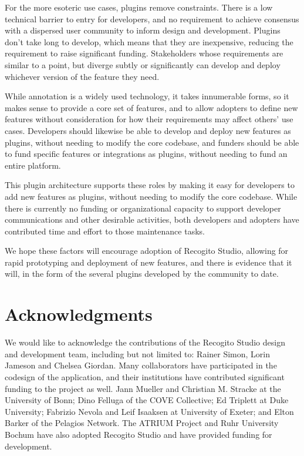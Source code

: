 \documentclass[final]{anthology-ch}         %
\begin{document}
  For the more esoteric use cases, plugins remove constraints. There is a low technical barrier to entry for developers, and no requirement to achieve consensus with a dispersed user community to inform design and development. Plugins don't take long to develop, which means that they are inexpensive, reducing the requirement to raise significant funding. Stakeholders whose requirements are similar to a point, but diverge subtly or significantly can develop and deploy whichever version of the feature they need.
  
  While annotation is a widely used technology, it takes innumerable forms, so it makes sense to provide a core set of features, and to allow adopters to define new features without consideration for how their requirements may affect others' use cases. Developers should likewise be able to develop and deploy new features as plugins, without needing to modify the core codebase, and funders should be able to fund specific features or integrations as plugins, without needing to fund an entire platform.

  This plugin architecture supports these roles by making it easy for developers to add new features as plugins, without needing to modify the core codebase. While there is currently no funding or organizational capacity to support developer communications and other desirable activities, both developers and adopters have contributed time and effort to those maintenance tasks.

We hope these factors will encourage adoption of Recogito Studio, allowing for rapid prototyping and deployment of new features, and there is evidence that it will, in the form of the several plugins developed by the community to date.

\section*{Acknowledgments}

We would like to acknowledge the contributions of the Recogito Studio design and development team, including but not limited to: Rainer Simon, Lorin Jameson and Chelsea Giordan. Many collaborators have participated in the codesign of the application, and their institutions have contributed significant funding to the project as well. Jann Mueller and Christian M. Stracke at the University of Bonn; Dino Felluga of the COVE Collective; Ed Triplett at Duke University; Fabrizio Nevola and Leif Isaaksen at University of Exeter; and Elton Barker of the Pelagios Network. The ATRIUM Project and Ruhr University Bochum have also adopted Recogito Studio and have provided funding for development.
\end{document}
